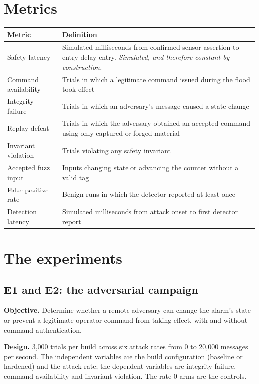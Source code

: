 \section{Metrics}

\begin{longtable}{@{}p{}p{}@{}}
\toprule
\textbf{Metric} & \textbf{Definition} \\
\midrule
\endhead
Safety latency & Simulated milliseconds from confirmed sensor assertion to entry-delay entry.
\emph{Simulated, and therefore constant by construction.} \\
Command availability & Trials in which a legitimate command issued during the flood took
effect \\
Integrity failure & Trials in which an adversary's message caused a state change \\
Replay defeat & Trials in which the adversary obtained an accepted command using only captured
or forged material \\
Invariant violation & Trials violating any safety invariant \\
Accepted fuzz input & Inputs changing state or advancing the counter without a valid tag \\
False-positive rate & Benign runs in which the detector reported at least once \\
Detection latency & Simulated milliseconds from attack onset to first detector report \\
\bottomrule
\end{longtable}

\section{The experiments}

\subsection{E1 and E2: the adversarial campaign}

\textbf{Objective.} Determine whether a remote adversary can change the alarm's state or
prevent a legitimate operator command from taking effect, with and without command
authentication.

\textbf{Design.} 3,000 trials per build across six attack rates from 0 to 20,000 messages per
second. The independent variables are the build configuration (baseline or hardened) and the
attack rate; the dependent variables are integrity failure, command availability and invariant
violation. The rate-0 arms are the controls.

